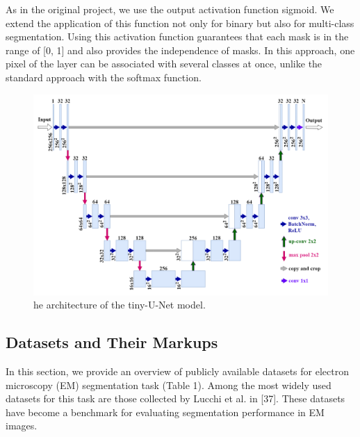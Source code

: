 \documentclass[journal,article,submit,pdftex,moreauthors]{Definitions/mdpi}
\begin{document}
As in the original project, we use the output activation function sigmoid. We extend the application of this function not only for binary but also for multi-class segmentation. Using this activation function guarantees that each mask is in the range of [0, 1] and also provides the independence of masks. In this approach, one pixel of the layer can be associated with several classes at once, unlike the standard approach with the softmax function.

\begin{figure}[H]
	\includegraphics[width=12 cm]{Definitions/figure-1.png}
	\caption{he architecture of the tiny-U-Net model.\label{fig1}}
\end{figure}

\subsection{Datasets and Their Markups}
In this section, we provide an overview of publicly available datasets for electron microscopy (EM) segmentation task (Table 1). Among the most widely used datasets for this task are those collected by Lucchi et al. in [37]. These datasets have become a benchmark for evaluating segmentation performance in EM images.
\end{document}
